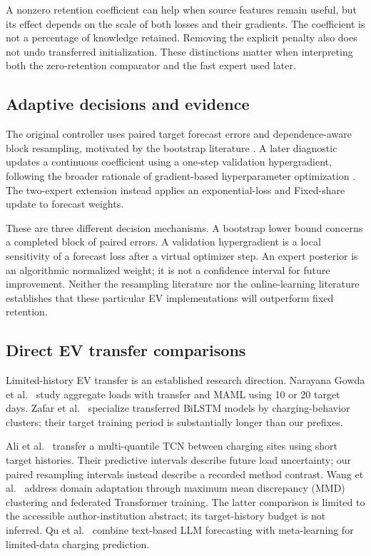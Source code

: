 \documentclass[pdflatex,iicol,sn-mathphys-num]{sn-jnl}
\begin{document}
A nonzero retention coefficient can help when source features remain useful, but its effect depends on the scale of both losses and their gradients. The coefficient is not a percentage of knowledge retained. Removing the explicit penalty also does not undo transferred initialization. These distinctions matter when interpreting both the zero-retention comparator and the fast expert used later.

\subsection{Adaptive decisions and evidence}
The original controller uses paired target forecast errors and dependence-aware block resampling, motivated by the bootstrap literature \cite{kunsch1989}. A later diagnostic updates a continuous coefficient using a one-step validation hypergradient, following the broader rationale of gradient-based hyperparameter optimization \cite{luketina2016}. The two-expert extension instead applies an exponential-loss and Fixed-share update \cite{herbster1998} to forecast weights.

These are three different decision mechanisms. A bootstrap lower bound concerns a completed block of paired errors. A validation hypergradient is a local sensitivity of a forecast loss after a virtual optimizer step. An expert posterior is an algorithmic normalized weight; it is not a confidence interval for future improvement. Neither the resampling literature nor the online-learning literature establishes that these particular EV implementations will outperform fixed retention.

\subsection{Direct EV transfer comparisons}

Limited-history EV transfer is an established research direction. Narayana Gowda et al.\ \cite{gowda2026} study aggregate loads with transfer and MAML using 10 or 20 target days. Zafar et al.\ \cite{zafar2025} specialize transferred BiLSTM models by charging-behavior clusters; their target training period is substantially longer than our prefixes.

Ali et al.\ \cite{ali2024} transfer a multi-quantile TCN between charging sites using short target histories. Their predictive intervals describe future load uncertainty; our paired resampling intervals instead describe a recorded method contrast. Wang et al.\ \cite{wang2025federated} address domain adaptation through maximum mean discrepancy (MMD) clustering and federated Transformer training. The latter comparison is limited to the accessible author-institution abstract; its target-history budget is not inferred. Qu et al.\ \cite{qu2024chatev} combine text-based LLM forecasting with meta-learning for limited-data charging prediction.
\end{document}
